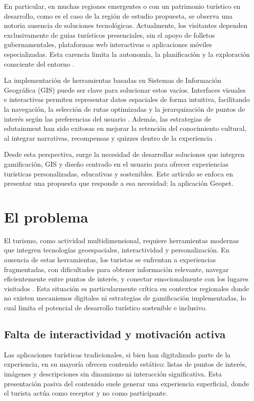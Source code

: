 \documentclass[12pt]{article}
\begin{document}
En particular, en muchas regiones emergentes o con un patrimonio turístico en desarrollo, como es el caso de la región de estudio propuesta, se observa una notoria ausencia de soluciones tecnológicas. Actualmente, los visitantes dependen exclusivamente de guías turísticos presenciales, sin el apoyo de folletos gubernamentales, plataformas web interactivas o aplicaciones móviles especializadas. Esta carencia limita la autonomía, la planificación y la exploración consciente del entorno \cite{ToARist2020,Emerald2020,Intech2019}.

La implementación de herramientas basadas en Sistemas de Información Geográfica (GIS) puede ser clave para solucionar estos vacíos. Interfaces visuales e interactivas permiten representar datos espaciales de forma intuitiva, facilitando la navegación, la selección de rutas optimizadas y la jerarquización de puntos de interés según las preferencias del usuario \cite{Arxiv2025,Kawanaka2021,NatureGIS2022}. Además, las estrategias de edutainment han sido exitosas en mejorar la retención del conocimiento cultural, al integrar narrativas, recompensas y quizzes dentro de la experiencia \cite{Frontiers2024,TravelPlot2018}.

Desde esta perspectiva, surge la necesidad de desarrollar soluciones que integren gamificación, GIS y diseño centrado en el usuario para ofrecer experiencias turísticas personalizadas, educativas y sostenibles. Este artículo se enfoca en presentar una propuesta que responde a esa necesidad: la aplicación Geopet.

\section{El problema}
El turismo, como actividad multidimensional, requiere herramientas modernas que integren tecnologías geoespaciales, interactividad y personalización. En ausencia de estas herramientas, los turistas se enfrentan a experiencias fragmentadas, con dificultades para obtener información relevante, navegar eficientemente entre puntos de interés, y conectar emocionalmente con los lugares visitados \cite{Pradhan2023,Weber2017}. Esta situación es particularmente crítica en contextos regionales donde no existen mecanismos digitales ni estrategias de gamificación implementadas, lo cual limita el potencial de desarrollo turístico sostenible e inclusivo.

\subsection{Falta de interactividad y motivación activa}
Las aplicaciones turísticas tradicionales, si bien han digitalizado parte de la experiencia, en su mayoría ofrecen contenido estático: listas de puntos de interés, imágenes y descripciones sin dinamismo ni interacción significativa. Esta presentación pasiva del contenido suele generar una experiencia superficial, donde el turista actúa como receptor y no como participante. 
\end{document}
